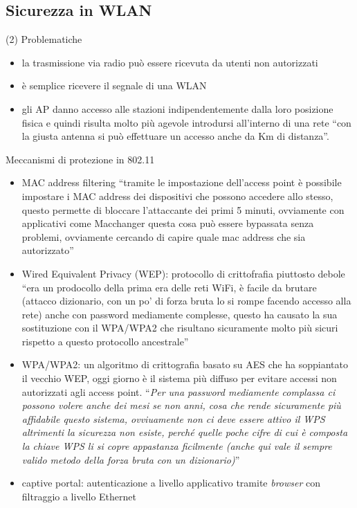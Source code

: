 \documentclass{book}
\begin{document}
\subsection{Sicurezza in WLAN}
\begin{tasks} (2)
  \task Problematiche
  \begin{itemize}
    \item la trasmissione via radio può essere ricevuta da utenti non autorizzati
    \item è semplice ricevere il segnale di una WLAN
    \item gli AP danno accesso alle stazioni indipendentemente dalla loro posizione fisica e quindi risulta molto più agevole introdursi all'interno di una rete ``con la giusta antenna si può effettuare un accesso anche da Km di distanza''.
  \end{itemize}
  \task Meccanismi di protezione in 802.11
  \begin{itemize}
  \item MAC address filtering ``tramite le impostazione dell'access point è possibile impostare i MAC address dei dispositivi che possono accedere allo stesso, questo permette di bloccare l'attaccante dei primi 5 minuti, ovviamente con applicativi come Macchanger questa cosa può essere bypassata senza problemi, ovviamente cercando di capire quale mac address che sia autorizzato''
  \item Wired Equivalent Privacy (WEP): protocollo di crittofrafia piuttosto debole ``era un prodocollo della prima era delle reti WiFi, è facile da brutare (attacco dizionario, con un po' di forza bruta lo si rompe facendo accesso alla rete) anche con password mediamente complesse, questo ha causato la sua sostituzione con il WPA/WPA2 che risultano sicuramente molto più sicuri rispetto a questo protocollo ancestrale''
  \item WPA/WPA2: un algoritmo di crittografia basato su AES che ha soppiantato il vecchio WEP, oggi giorno è il sistema più diffuso per evitare accessi non autorizzati agli access point. ``\textit{Per una password mediamente complassa ci possono volere anche dei mesi se non anni, cosa che rende sicuramente più affidabile questo sistema, ovviuamente non ci deve essere attivo il WPS altrimenti la sicurezza non esiste, perché quelle poche cifre di cui è composta la chiave WPS li si copre appastanza ficilmente (anche qui vale il sempre valido metodo della forza bruta con un dizionario)}''
  \item captive portal: autenticazione a livello applicativo tramite \textit{browser} con filtraggio a livello Ethernet
    \end{itemize}
\end{tasks}
\end{document}
